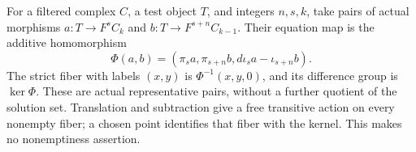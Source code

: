 \begin{definition}
  \label{def:strict-ess-representative-fiber}
  \leanok
  For a filtered complex $C$, a test object $T$, and integers $n,s,k$,
  take pairs of actual morphisms
  $a:T\to F^sC_k$ and $b:T\to F^{s+n}C_{k-1}$.
  Their equation map is the additive homomorphism
  \[
    \Phi(a,b)=(\pi_s a,\pi_{s+n}b,d\iota_s a-\iota_{s+n}b).
  \]
  The strict fiber with labels $(x,y)$ is
  $\Phi^{-1}(x,y,0)$, and its difference group is $\ker\Phi$.
  These are actual representative pairs, without a further quotient of the
  solution set.  Translation and subtraction give a free transitive action
  on every nonempty fiber; a chosen point identifies that fiber with the
  kernel.  This makes no nonemptiness assertion.
\end{definition}

